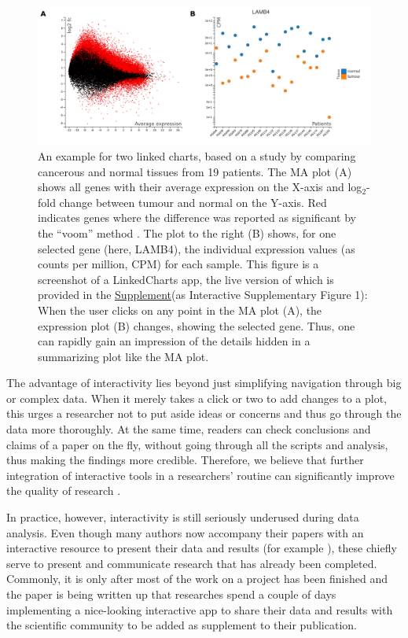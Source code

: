 \documentclass[twocolumn,10pt]{article}
\newcommand{\Supplement}{\href{https://anders-biostat.github.io/lc-paper/}{Supplement}}
\begin{document}
\begin{figure}
	\includegraphics[width=\textwidth]{FigD/figD.png}
	\caption{An example for two linked charts, based on a study by \citet{conway_2015} comparing cancerous and normal tissues from 19 patients. The MA plot (A) shows all genes with their average expression on the X-axis and log$_2$-fold change between tumour and normal on the Y-axis. Red indicates genes where the difference was reported as significant by the ``voom'' method \citep{law_2014}. The plot to the right (B) shows, for one selected gene (here, LAMB4), the individual expression values (as counts per million, CPM) for each sample. This figure is a screenshot of a LinkedCharts app, the live version of which is provided in the \Supplement (as Interactive Supplementary Figure 1): When the user clicks on any point in the MA plot (A), the expression plot (B) changes, showing the selected gene. Thus, one can rapidly gain an impression of the details hidden in a summarizing plot like the MA plot.}  
	\label{FigD}
\end{figure}



The advantage of interactivity lies beyond just simplifying navigation through big or complex data. When it merely takes a click or two to add changes to a plot, this urges a researcher not to put aside ideas or concerns and thus go through the data more thoroughly. At the same time, readers can check conclusions and claims of a paper on the fly, without going through all the scripts and analysis, thus making the findings more credible. Therefore, we believe that further integration of interactive tools in a researchers' routine can significantly improve the quality of research \citep{shander_2016, yuk_2014}.

In practice, however, interactivity is still seriously underused during data analysis. Even though many authors now accompany their papers with an interactive resource to present their data and results (for example \citet{travaglini_2020, roider_2020, kalucka_2020}), these chiefly serve to present and communicate research that has already been completed. Commonly, it is only after most of the work on a project has been finished and the paper is being written up that researches spend a couple of days implementing a nice-looking interactive app to share their data and results with the scientific community \citep{batch_2017} to be added as supplement to their publication. 
\end{document}
